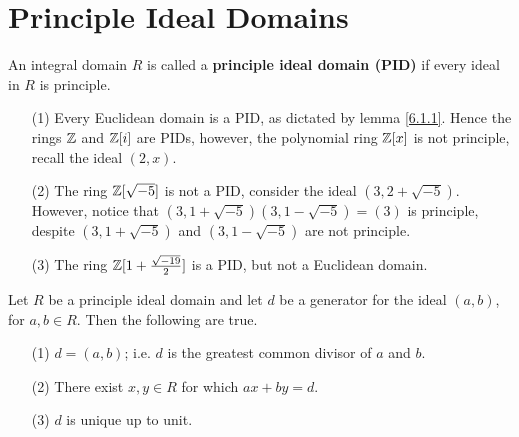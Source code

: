 \section{Principle Ideal Domains}
\label{section_6.2}

\begin{definition}
  An integral domain $R$ is called a \textbf{principle ideal domain (PID)} if
  every ideal in $R$ is principle.
\end{definition}

\begin{example}\label{example_6.4}
  \begin{enumerate}
    \item[(1)] Every Euclidean domain is a PID, as dictated by lemma
      \ref{6.1.1}. Hence the rings $\mathbb{Z}$ and  $\mathbb{Z}[i]$ are PIDs, however,
      the polynomial ring $\mathbb{Z}[x]$ is not principle, recall the ideal
      $(2,x)$.

    \item[(2)] The ring $\mathbb{Z}[\sqrt{-5}]$ is not a PID, consider the ideal
      $(3,2+\sqrt{-5})$. However, notice that
      $(3,1+\sqrt{-5})(3,1-\sqrt{-5})=(3)$ is principle, despite
      $(3,1+\sqrt{-5})$ and $(3,1-\sqrt{-5})$ are not principle.

    \item[(3)] The ring $\mathbb{Z}[1+\frac{\sqrt{-19}}{2}]$ is a PID, but not a
      Euclidean domain.
  \end{enumerate}
\end{example}

\begin{lemma}\label{lemma_6.6.1}
  Let $R$ be a principle ideal domain and let $d$ be a generator for the ideal
  $(a,b)$, for $a,b \in R$. Then the following are true.
  \begin{enumerate}
    \item[(1)] $d=(a,b)$; i.e. $d$ is the greatest common divisor of $a$ and
      $b$.

    \item[(2)] There exist $x,y \in R$ for which  $ax+by=d$.

    \item[(3)] $d$ is unique up to unit.
  \end{enumerate}
\end{lemma}

